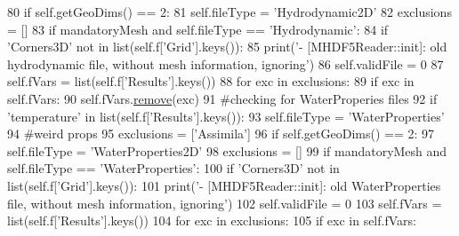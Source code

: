\begin{DoxyCode}
80                 \textcolor{keywordflow}{if} self.getGeoDims() == 2:
81                     self.fileType = \textcolor{stringliteral}{'Hydrodynamic2D'}
82                     exclusions = [] 
83                 \textcolor{keywordflow}{if} mandatoryMesh \textcolor{keywordflow}{and} self.fileType == \textcolor{stringliteral}{'Hydrodynamic'}:
84                     \textcolor{keywordflow}{if} \textcolor{stringliteral}{'Corners3D'} \textcolor{keywordflow}{not} \textcolor{keywordflow}{in} list(self.f[\textcolor{stringliteral}{'Grid'}].keys()):
85                         print(\textcolor{stringliteral}{'- [MHDF5Reader::init]: old hydrodynamic file, without mesh information,
       ignoring'})
86                         self.validFile = 0
87                 self.fVars = list(self.f[\textcolor{stringliteral}{'Results'}].keys())                
88                 \textcolor{keywordflow}{for} exc \textcolor{keywordflow}{in} exclusions:
89                     \textcolor{keywordflow}{if} exc \textcolor{keywordflow}{in} self.fVars:
90                         self.fVars.\mbox{\hyperlink{namespaceabstract__linkedlist__mod_a9f4028744d1ca6536e28c76d2795ace3}{remove}}(exc)
91             \textcolor{comment}{#checking for WaterProperies files}
92             \textcolor{keywordflow}{if} \textcolor{stringliteral}{'temperature'} \textcolor{keywordflow}{in} list(self.f[\textcolor{stringliteral}{'Results'}].keys()):
93                 self.fileType = \textcolor{stringliteral}{'WaterProperties'}
94                 \textcolor{comment}{#weird props}
95                 exclusions = [\textcolor{stringliteral}{'Assimila'}]
96                 \textcolor{keywordflow}{if} self.getGeoDims() == 2:
97                     self.fileType = \textcolor{stringliteral}{'WaterProperties2D'}
98                     exclusions = []
99                 \textcolor{keywordflow}{if} mandatoryMesh \textcolor{keywordflow}{and} self.fileType == \textcolor{stringliteral}{'WaterProperties'}:
100                     \textcolor{keywordflow}{if} \textcolor{stringliteral}{'Corners3D'} \textcolor{keywordflow}{not} \textcolor{keywordflow}{in} list(self.f[\textcolor{stringliteral}{'Grid'}].keys()):
101                         print(\textcolor{stringliteral}{'- [MHDF5Reader::init]: old WaterProperties file, without mesh information,
       ignoring'})
102                         self.validFile = 0
103                 self.fVars = list(self.f[\textcolor{stringliteral}{'Results'}].keys())                
104                 \textcolor{keywordflow}{for} exc \textcolor{keywordflow}{in} exclusions:
105                     \textcolor{keywordflow}{if} exc \textcolor{keywordflow}{in} self.fVars:

\end{DoxyCode}
